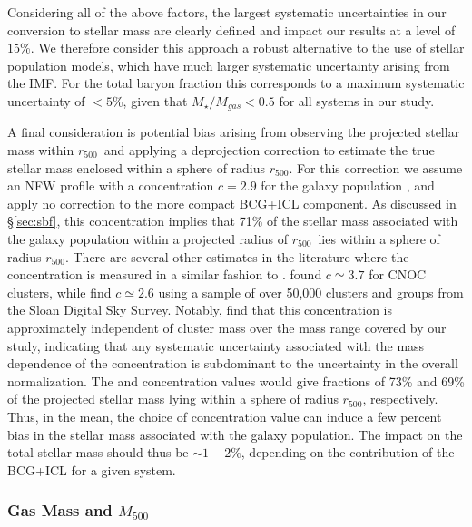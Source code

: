 \documentclass[preprint]{emulateapj}
\newcommand\rfive{$r_{500}$}
\newcommand\mfive{${M}_{500}$}
\begin{document}
Considering all of the above factors, the largest
systematic uncertainties in our conversion to stellar mass are clearly
defined and impact our results at a level of $15$\%.  We therefore
consider this approach a robust alternative to the use of stellar population
models, which have much larger systematic uncertainty arising from the
IMF. For the total baryon fraction this corresponds to a maximum systematic uncertainty of $<5$\%, given that $M_\star/M_{gas}<0.5$ for all systems in our study.

A final consideration is potential bias arising from observing the
projected stellar mass within \rfive\ and applying a deprojection
correction to estimate the true stellar mass enclosed within a sphere
of radius \rfive.  For this correction we assume an NFW profile with a
concentration $c=2.9$ for the galaxy population \citep{lin2004a}, and
apply no correction to the more compact BCG+ICL component. As
discussed in \S \ref{sec:sbf}, this concentration implies that 71\% of
the stellar mass associated with the galaxy population within a
projected radius of \rfive\ lies within a sphere of radius
\rfive. There are several other estimates in the literature where the
concentration is measured in a similar fashion to
\citet{lin2004a}. \citet{carlberg1997} found $c\simeq3.7$ for CNOC
clusters, while \citet{budzynski2012} find $c\simeq2.6$ using a sample
of over 50,000 clusters and groups from the Sloan Digital Sky Survey.
Notably, \citet{budzynski2012} find that this concentration is
approximately independent of cluster mass over the mass range covered
by our study, indicating that any systematic uncertainty associated
with the mass dependence of the concentration is subdominant to the
uncertainty in the overall normalization.  The \citet{carlberg1997}
and \citet{budzynski2012} concentration values would give fractions of
73\% and 69\% of the projected stellar mass lying within a sphere of
radius \rfive, respectively. Thus, in the mean, the choice of
concentration value can induce a few percent bias in the stellar mass
associated with the galaxy population.  The impact on the total
stellar mass should thus be $\sim1-2$\%, depending on the contribution
of the BCG+ICL for a given system.




\subsubsection{Gas Mass and \mfive}
\label{sec:gasbias}
\end{document}
